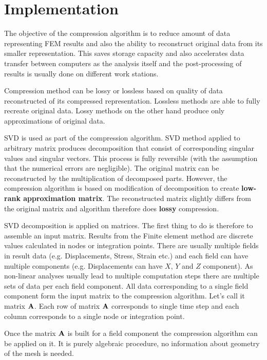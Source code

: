 \section{Implementation}
\label{sec:implementation}

The objective of the compression algorithm is to reduce amount of data representing FEM results and also the ability to reconstruct original data from its smaller representation. This saves storage capacity and also accelerates data transfer between computers as the analysis itself and the post-processing of results is usually done on different work stations.

Compression method can be lossy or lossless based on quality of data reconstructed of its compressed representation. Lossless methods are able to fully recreate original data. Lossy methods on the other hand produce only approximations of original data. 

SVD is used as part of the compression algorithm. SVD method applied to arbitrary matrix produces decomposition that consist of corresponding singular values and singular vectors. This process is fully reversible (with the assumption that the numerical errors are negligible). The original matrix can be reconstructed by the multiplication of decomposed parts. However, the compression algorithm is based on modification of decomposition to create \textbf{low-rank approximation matrix}. The reconstructed matrix slightly differs from the original matrix and algorithm therefore does \textbf{lossy} compression.

SVD decomposition is applied on matrices. The first thing to do is therefore to assemble an input matrix. Results from the Finite element method are discrete values calculated in nodes or integration points. There are usually multiple fields in result data (e.g. Displacements, Stress, Strain etc.) and each field can have multiple components (e.g. Displacements can have $X$, $Y$ and $Z$ component). As non-linear analyses usually lead to multiple computation steps there are multiple sets of data per each field component. All data corresponding to a single field component form the input matrix to the compression algorithm. Let's call it matrix $\mathbf{A}$. Each row of matrix $\mathbf{A}$ corresponds to single time step and each column corresponds to a single node or integration point.

Once the matrix $\mathbf{A}$ is built for a field component the compression algorithm can be applied on it. It is purely algebraic procedure, no information about geometry of the mesh is needed. 

